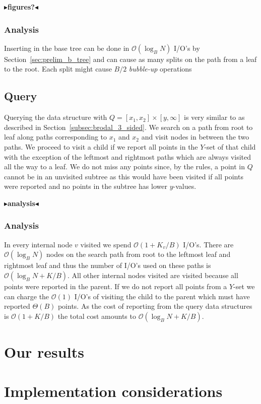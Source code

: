 \documentclass[twoside,11pt,openright]{report}
\newcommand{\todo}[1]{{\color[rgb]{.5,0,0}\textbf{$\blacktriangleright$#1$\blacktriangleleft$}}}
\begin{document}
\todo{figures?}

\subsection{Analysis}
Inserting in the base tree can be done in $\mathcal{O}(\log_B N)$ I/O's by Section~\ref{sec:prelim_b_tree} and can cause as many splits on the path from a leaf to the root. Each split might cause $B/2$ \textit{bubble-up} operations

\section{Query}
\label{sec:arge_query}
Querying the data structure with $Q = \left[ x_1, x_2 \right] \times \left[ y, \infty \right]$ is very similar to as described in Section~\ref{subsec:brodal_3_sided}. We search on a path from root to leaf along paths corresponding to $x_1$ and $x_2$ and visit nodes in between the two paths. We proceed to visit a child if we report all points in the $Y$-set of that child with the exception of the leftmost and rightmost paths which are always visited all the way to a leaf. We do not miss any points since, by the rules, a point in $Q$ cannot be in an unvisited subtree as this would have been visited if all points were reported and no points in the subtree has lower $y$-values.

\todo{analysis}
\subsection{Analysis}
In every internal node $v$ visited we spend $\mathcal{O}(1+K_v/B)$ I/O's. There are $\mathcal{O}(\log_B N)$ nodes on the search path from root to the leftmost leaf and rightmost leaf and thus the number of I/O's used on these paths is $\mathcal{O}(\log_B N + K/B)$. All other internal nodes visited are visited because all points were reported in the parent. If we do not report all points from a $Y$-set we can charge the $\mathcal{O}(1)$ I/O's of visiting the child to the parent which must have reported $\Theta(B)$ points. As the cost of reporting from the query data structures is $\mathcal{O}(1+K/B)$ the total cost amounts to $\mathcal{O}(\log_B N + K/B)$.

\chapter{Our results}

\chapter{Implementation considerations}
\end{document}
